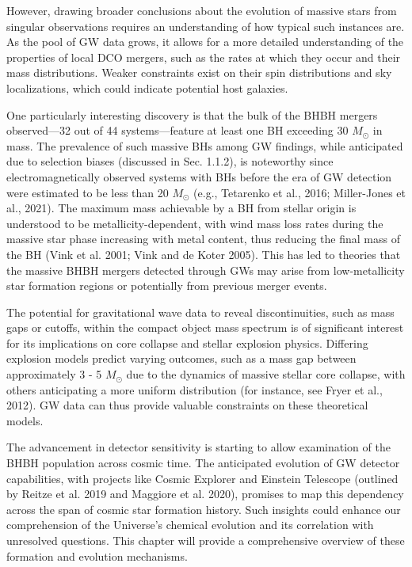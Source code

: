 However, drawing broader conclusions about the evolution of massive stars from singular observations requires an understanding of how typical such instances are. As the pool of GW data grows, it allows for a more detailed understanding of the properties of local DCO mergers, such as the rates at which they occur and their mass distributions. Weaker constraints exist on their spin distributions and sky localizations, which could indicate potential host galaxies.

One particularly interesting discovery is that the bulk of the BHBH mergers observed—32 out of 44 systems—feature at least one BH exceeding 30 $M_{\odot}$ in mass. The prevalence of such massive BHs among GW findings, while anticipated due to selection biases (discussed in Sec. 1.1.2), is noteworthy since electromagnetically observed systems with BHs before the era of GW detection were estimated to be less than 20 $M_{\odot}$ (e.g., Tetarenko et al., 2016; Miller-Jones et al., 2021). The maximum mass achievable by a BH from stellar origin is understood to be metallicity-dependent, with wind mass loss rates during the massive star phase increasing with metal content, thus reducing the final mass of the BH (Vink et al. 2001; Vink and de Koter 2005). This has led to theories that the massive BHBH mergers detected through GWs may arise from low-metallicity star formation regions or potentially from previous merger events.

The potential for gravitational wave data to reveal discontinuities, such as mass gaps or cutoffs, within the compact object mass spectrum is of significant interest for its implications on core collapse and stellar explosion physics. Differing explosion models predict varying outcomes, such as a mass gap between approximately 3 - 5 $M_{\odot}$ due to the dynamics of massive stellar core collapse, with others anticipating a more uniform distribution (for instance, see Fryer et al., 2012). GW data can thus provide valuable constraints on these theoretical models.

The advancement in detector sensitivity is starting to allow examination of the BHBH population across cosmic time. The anticipated evolution of GW detector capabilities, with projects like Cosmic Explorer and Einstein Telescope (outlined by Reitze et al. 2019 and Maggiore et al. 2020), promises to map this dependency across the span of cosmic star formation history. Such insights could enhance our comprehension of the Universe's chemical evolution and its correlation with unresolved questions. This chapter will provide a comprehensive overview of these formation and evolution mechanisms.


